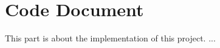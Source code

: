 \chapter{Code Document}\label{ch:ch2label}

This part is about the implementation of this project. ...


